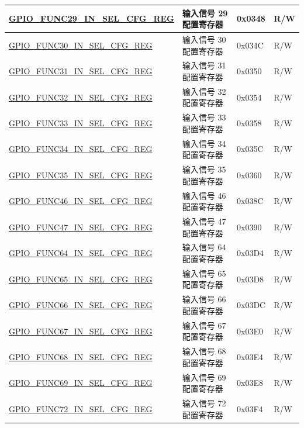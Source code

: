 \begin{longtable}{ | p{6cm} | p{7.2cm} | p{1.3cm} | p{1cm} | }
\hyperref[regdesc:GPIOFUNCPINSELCFGREG]{GPIO\_FUNC29\_IN\_SEL\_CFG\_REG} & 输入信号 29 配置寄存器 & 0x0348 & R/W \\ \hline
\hyperref[regdesc:GPIOFUNCPINSELCFGREG]{GPIO\_FUNC30\_IN\_SEL\_CFG\_REG} & 输入信号 30 配置寄存器 & 0x034C & R/W \\ \hline
\hyperref[regdesc:GPIOFUNCPINSELCFGREG]{GPIO\_FUNC31\_IN\_SEL\_CFG\_REG} & 输入信号 31 配置寄存器 & 0x0350 & R/W \\ \hline
\hyperref[regdesc:GPIOFUNCPINSELCFGREG]{GPIO\_FUNC32\_IN\_SEL\_CFG\_REG} & 输入信号 32 配置寄存器 & 0x0354 & R/W \\ \hline
\hyperref[regdesc:GPIOFUNCPINSELCFGREG]{GPIO\_FUNC33\_IN\_SEL\_CFG\_REG} & 输入信号 33 配置寄存器 & 0x0358 & R/W \\ \hline
\hyperref[regdesc:GPIOFUNCPINSELCFGREG]{GPIO\_FUNC34\_IN\_SEL\_CFG\_REG} & 输入信号 34 配置寄存器 & 0x035C & R/W \\ \hline
\hyperref[regdesc:GPIOFUNCPINSELCFGREG]{GPIO\_FUNC35\_IN\_SEL\_CFG\_REG} & 输入信号 35 配置寄存器 & 0x0360 & R/W \\ \hline
\hyperref[regdesc:GPIOFUNCQINSELCFGREG]{GPIO\_FUNC46\_IN\_SEL\_CFG\_REG} & 输入信号 46 配置寄存器 & 0x038C & R/W \\ \hline
\hyperref[regdesc:GPIOFUNCQINSELCFGREG]{GPIO\_FUNC47\_IN\_SEL\_CFG\_REG} & 输入信号 47 配置寄存器 & 0x0390 & R/W \\ \hline
\hyperref[regdesc:GPIOFUNCRINSELCFGREG]{GPIO\_FUNC64\_IN\_SEL\_CFG\_REG} & 输入信号 64 配置寄存器 & 0x03D4 & R/W \\ \hline
\hyperref[regdesc:GPIOFUNCRINSELCFGREG]{GPIO\_FUNC65\_IN\_SEL\_CFG\_REG} & 输入信号 65 配置寄存器 & 0x03D8 & R/W \\ \hline
\hyperref[regdesc:GPIOFUNCRINSELCFGREG]{GPIO\_FUNC66\_IN\_SEL\_CFG\_REG} & 输入信号 66 配置寄存器 & 0x03DC & R/W \\ \hline
\hyperref[regdesc:GPIOFUNCRINSELCFGREG]{GPIO\_FUNC67\_IN\_SEL\_CFG\_REG} & 输入信号 67 配置寄存器 & 0x03E0 & R/W \\ \hline
\hyperref[regdesc:GPIOFUNCRINSELCFGREG]{GPIO\_FUNC68\_IN\_SEL\_CFG\_REG} & 输入信号 68 配置寄存器 & 0x03E4 & R/W \\ \hline
\hyperref[regdesc:GPIOFUNCRINSELCFGREG]{GPIO\_FUNC69\_IN\_SEL\_CFG\_REG} & 输入信号 69 配置寄存器 & 0x03E8 & R/W \\ \hline
\hyperref[regdesc:GPIOFUNCTINSELCFGREG]{GPIO\_FUNC72\_IN\_SEL\_CFG\_REG} & 输入信号 72 配置寄存器 & 0x03F4 & R/W \\ \hline

\end{longtable}
